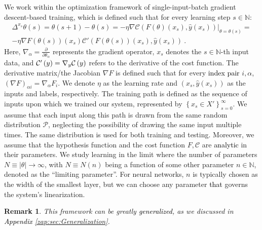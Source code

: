 \documentclass{article} %
\newtheorem{remark}{Remark}
[section]
\begin{document}
We work within the optimization framework of single-input-batch gradient descent-based training, which is defined such that for every learning step \(s\in\mathbb{N}\):
\begin{equation}
\begin{array}{c}
\Delta^{x_{s}}\theta\left(s\right)=\theta\left(s+1\right)-\theta\left(s\right)=
\left.-\eta\nabla\mathcal{C}\left(F\left(\theta\right)\left(x_{s}\right),\hat{y}\left(x_{s}\right)\right)\right|_{\theta=\theta\left(s\right)}=
\\
-\eta\nabla F\left(\theta\left(s\right)\right)\left(x_{s}\right)\mathcal{C}'\left(F\left(\theta\left(s\right)\right)\left(x_{s}\right),\hat{y}\left(x_{s}\right)\right)\ .
\end{array}
\label{eq:GD}
\end{equation}
Here, $\nabla_{\alpha}=\frac{\partial}{\partial\theta_{\alpha}}$ represents the gradient operator, $x_s$ denotes the \(s\in\mathbb{N}\)-th input data, and $\mathcal{C}'\left(y\right)=\nabla_{y}\textcolor{black}{\mathcal{C}}\left(y\right)$ refers to the derivative of the cost function. The derivative matrix/the Jacobian $\nabla F$ is defined such that for every \textcolor{black}{index pair} ${i,\alpha}$, ${\left(\nabla F\right)}_{\alpha i}=\nabla_{\alpha}F_{i}$. We denote $\eta$ as the learning rate and $ \left(x_{s},\hat{y}\left(x_{s}\right)\right)$ as the inputs and labels, respectively. The training path is defined as the sequence of inputs upon which we trained our system, represented by \(\left\{x_{s}\in X'\right\}_{s=0}^{\infty}\). We assume that each input along this path is drawn from the same random distribution $\mathcal{P}$,
neglecting the possibility of drawing the same input multiple times. The same distribution is used for both training and testing. Moreover, we assume that the hypothesis function and the cost function $F,\mathcal{C}$ are \textcolor{black}{analytic} in their parameters. We study learning in the limit where the number of parameters $N \equiv |\theta| \rightarrow \infty$, with $N \equiv N(n)$ being a function of some other parameter $n\in\mathbb{N}$, denoted as the ``limiting parameter''. For neural networks, $n$ is typically chosen as the width of the smallest layer, but we can choose any parameter \textcolor{black}{that} governs the system's linearization. 
\begin{remark}
\textup
{This framework can be greatly \textcolor{black}{generalized}, as we discussed in \textcolor{black}{Appendix} \ref{zap:sec:Generalization}.}
\end{remark}
\end{document}
